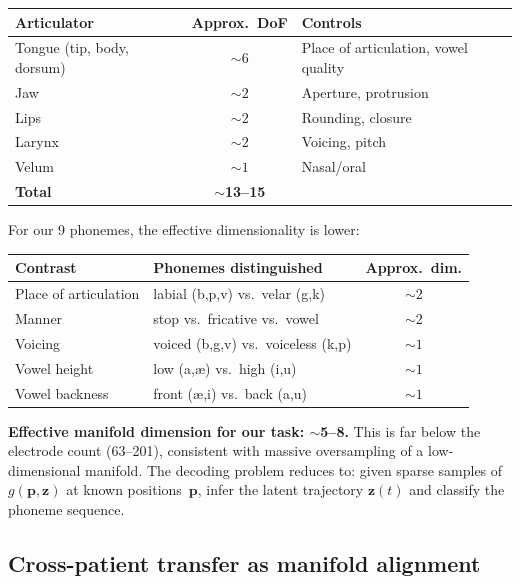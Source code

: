 \documentclass[11pt,letterpaper]{article}
\newcommand{\bfp}{\mathbf{p}}
\newcommand{\bfz}{\mathbf{z}}
\begin{document}
\begin{table}[h]
\centering\small
\begin{tabular}{@{}lcl@{}}
\toprule
\textbf{Articulator} & \textbf{Approx.\ DoF} & \textbf{Controls} \\
\midrule
Tongue (tip, body, dorsum) & ${\sim}6$ & Place of articulation, vowel quality \\
Jaw & ${\sim}2$ & Aperture, protrusion \\
Lips & ${\sim}2$ & Rounding, closure \\
Larynx & ${\sim}2$ & Voicing, pitch \\
Velum & ${\sim}1$ & Nasal/oral \\
\midrule
\textbf{Total} & ${\sim}$\textbf{13--15} & \\
\bottomrule
\end{tabular}
\end{table}

For our 9 phonemes, the effective dimensionality is lower:

\begin{table}[h]
\centering\small
\begin{tabular}{@{}llc@{}}
\toprule
\textbf{Contrast} & \textbf{Phonemes distinguished} & \textbf{Approx.\ dim.} \\
\midrule
Place of articulation & labial (b,p,v) vs.\ velar (g,k) & ${\sim}2$ \\
Manner & stop vs.\ fricative vs.\ vowel & ${\sim}2$ \\
Voicing & voiced (b,g,v) vs.\ voiceless (k,p) & ${\sim}1$ \\
Vowel height & low (a,\ae) vs.\ high (i,u) & ${\sim}1$ \\
Vowel backness & front (\ae,i) vs.\ back (a,u) & ${\sim}1$ \\
\bottomrule
\end{tabular}
\end{table}

\noindent\textbf{Effective manifold dimension for our task: ${\sim}$5--8.} This is far below the electrode count (63--201), consistent with massive oversampling of a low-dimensional manifold. The decoding problem reduces to: given sparse samples of $g(\bfp, \bfz)$ at known positions~$\bfp$, infer the latent trajectory $\bfz(t)$ and classify the phoneme sequence.

\subsection{Cross-patient transfer as manifold alignment}
\end{document}
